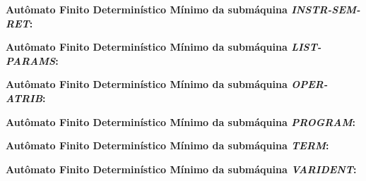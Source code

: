 \textbf{Autômato Finito Determinístico Mínimo da submáquina \emph{INSTR-SEM-RET}:}


\textbf{Autômato Finito Determinístico Mínimo da submáquina \emph{LIST-PARAMS}:}


\textbf{Autômato Finito Determinístico Mínimo da submáquina \emph{OPER-ATRIB}:}


\textbf{Autômato Finito Determinístico Mínimo da submáquina \emph{PROGRAM}:}


\textbf{Autômato Finito Determinístico Mínimo da submáquina \emph{TERM}:}


\textbf{Autômato Finito Determinístico Mínimo da submáquina \emph{VARIDENT}:}

